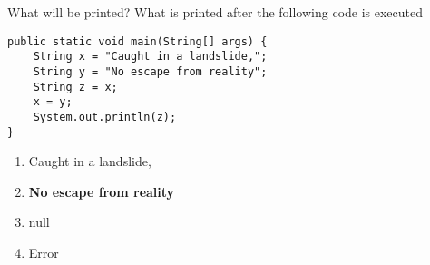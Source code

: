 \documentclass[9pt]{beamer}
\begin{document}
\begin{frame}[fragile]{What will be printed?}
  What is printed after the following code is executed
  \begin{lstlisting}
public static void main(String[] args) {
    String x = "Caught in a landslide,";
    String y = "No escape from reality";
    String z = x;
    x = y;
    System.out.println(z);
}
  \end{lstlisting}
  \begin{enumerate}
    \item
      Caught in a landslide,
    \item
      \textbf<2>{No escape from reality}
    \item
      null
    \item
      Error
  \end{enumerate}
\end{frame}
\end{document}
